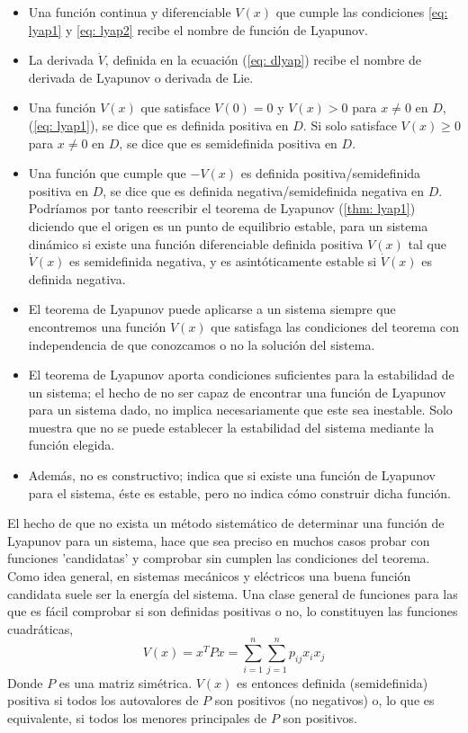 \begin{itemize}
\item Una función continua y diferenciable $V(x)$ que cumple las condiciones \ref{eq: lyap1} y \ref{eq: lyap2} recibe el nombre de función de Lyapunov.
\item La derivada $\dot V$, definida en la ecuación (\ref{eq: dlyap}) recibe el nombre de derivada de Lyapunov o derivada de Lie.
\item Una función $V(x)$ que satisface $V(0)=0$ y $V(x)>0$ para $x\neq 0$ en $D$, (\ref{eq: lyap1}), se dice que es definida positiva en $D$. Si solo satisface $V(x)\geq 0$ para $x\neq 0$ en $D$, se dice que es semidefinida positiva en $D$.
\item Una función que cumple que $-V(x)$ es definida positiva/semidefinida positiva en $D$, se dice que es definida negativa/semidefinida negativa en $D$. Podríamos por tanto reescribir el teorema de Lyapunov (\ref{thm: lyap1}) diciendo que el origen es un punto de equilibrio estable, para un sistema dinámico si existe una función diferenciable definida positiva $V(x)$ tal que $\dot V(x)$ es semidefinida negativa, y es asintóticamente estable si $\dot V(x)$ es definida negativa.
\item El teorema de Lyapunov  puede aplicarse a un sistema siempre que encontremos una función $V(x)$ que satisfaga las condiciones del teorema con independencia de que conozcamos o no la solución del sistema.
\item El teorema de Lyapunov aporta condiciones suficientes para la estabilidad de un sistema; el hecho de no ser capaz de encontrar una función de Lyapunov para un sistema dado, no implica necesariamente que este sea inestable. Solo muestra que no se puede establecer la estabilidad del sistema mediante la función elegida.
\item Además, no es constructivo; indica que si existe una función de Lyapunov para el sistema, éste es estable, pero no indica cómo construir dicha función. 
\end{itemize}

El hecho de que no exista un método sistemático de determinar una función de Lyapunov para un sistema, hace que sea preciso en muchos casos probar con funciones 'candidatas' y comprobar sin cumplen las condiciones del teorema. Como idea general, en sistemas mecánicos y eléctricos una buena función candidata suele ser la energía del sistema. Una clase general de funciones para las que es fácil comprobar si son definidas positivas o no, lo constituyen las funciones cuadráticas,
\begin{equation}
V(x) = x^TPx = \sum_{i=1}^n \sum_{j=1}^n p_{ij}x_ix_j
\end{equation}
Donde $P$ es una matriz simétrica. $V(x)$ es entonces definida (semidefinida) positiva si todos los autovalores de $P$ son positivos (no negativos) o, lo que es equivalente, si todos los menores principales de $P$ son positivos.

